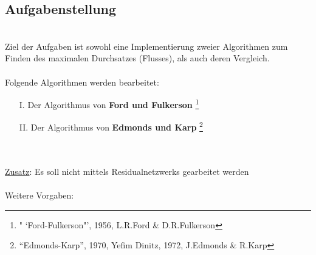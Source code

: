 \documentclass[11pt]{article}
\begin{document}
    \subsection{Aufgabenstellung}\\
    Ziel der Aufgaben ist sowohl eine Implementierung zweier Algorithmen zum Finden des maximalen Durchsatzes (Flusses), als auch deren Vergleich.\\~\\
    Folgende Algorithmen werden bearbeitet:
    \begin{itemize}
        \item[I.] Der Algorithmus von \textbf{Ford und Fulkerson} \footnote[1]{" `Ford-Fulkerson"', 1956, L.R.Ford \& D.R.Fulkerson}
        \item[II.] Der Algorithmus von \textbf{Edmonds und Karp} \footnote[2]{"`Edmonds-Karp"', 1970, Yefim Dinitz, 1972, J.Edmonds \& R.Karp}
    \end{itemize}\\~\\
    \underline{Zusatz}: Es soll nicht mittels Residualnetzwerks gearbeitet werden\\~\\
    Weitere Vorgaben:
\end{document}

